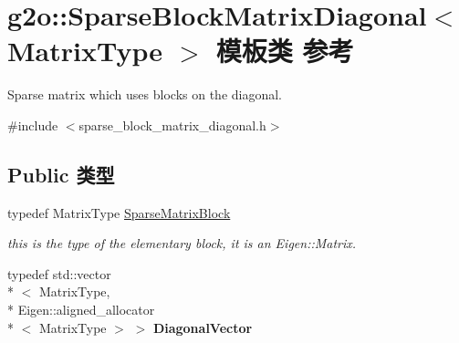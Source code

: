 \hypertarget{classg2o_1_1SparseBlockMatrixDiagonal}{\section{g2o\-:\-:Sparse\-Block\-Matrix\-Diagonal$<$ Matrix\-Type $>$ 模板类 参考}
\label{classg2o_1_1SparseBlockMatrixDiagonal}
}


Sparse matrix which uses blocks on the diagonal.  




{\ttfamily \#include $<$sparse\-\_\-block\-\_\-matrix\-\_\-diagonal.\-h$>$}

\subsection*{Public 类型}
\begin{DoxyCompactItemize}
\item 
\hypertarget{classg2o_1_1SparseBlockMatrixDiagonal_a93a57bc93d5b099fcd424ba1fc1a0585}{typedef Matrix\-Type \hyperlink{classg2o_1_1SparseBlockMatrixDiagonal_a93a57bc93d5b099fcd424ba1fc1a0585}{Sparse\-Matrix\-Block}}\label{classg2o_1_1SparseBlockMatrixDiagonal_a93a57bc93d5b099fcd424ba1fc1a0585}

\begin{DoxyCompactList}\small\item\em this is the type of the elementary block, it is an Eigen\-::\-Matrix. \end{DoxyCompactList}\item 
\hypertarget{classg2o_1_1SparseBlockMatrixDiagonal_a2eb7fc4130fac5c499b57f3bec855812}{typedef std\-::vector\\*
$<$ Matrix\-Type, \\*
Eigen\-::aligned\-\_\-allocator\\*
$<$ Matrix\-Type $>$ $>$ {\bfseries Diagonal\-Vector}}\label{classg2o_1_1SparseBlockMatrixDiagonal_a2eb7fc4130fac5c499b57f3bec855812}

\end{DoxyCompactItemize}
